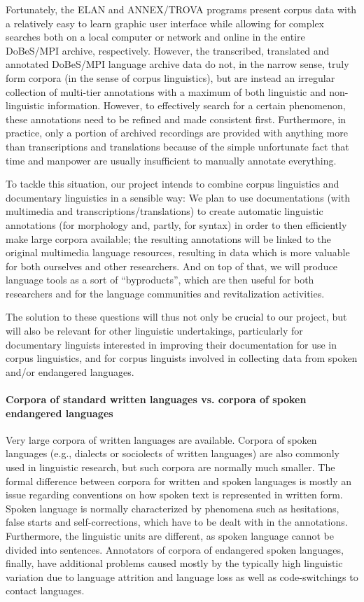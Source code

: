 \documentclass[a4paper,12pt]{article}
\begin{document}
Fortunately, the ELAN and ANNEX/TROVA programs present corpus data with a relatively easy to learn graphic user interface while allowing for complex searches both on a local computer or network and online in the entire DoBeS/MPI archive, respectively. However, the transcribed, translated and annotated DoBeS/MPI language archive data do not, in the narrow sense, truly form corpora (in the sense of corpus linguistics), but are instead an irregular collection of multi-tier annotations with a maximum of both linguistic and non-linguistic information. However, to effectively search for a certain phenomenon, these annotations need to be refined and made consistent first. Furthermore, in practice, only a portion of archived recordings are provided with anything more than transcriptions and translations because of the simple unfortunate fact that time and manpower are usually insufficient to manually annotate everything.

To tackle this situation, our project intends to combine corpus linguistics and documentary linguistics in a sensible way: We plan to use documentations (with multimedia and transcriptions/translations) to create automatic linguistic annotations (for morphology and, partly, for syntax) in order to then efficiently make large corpora available; the resulting annotations will be linked to the original multimedia language resources, resulting in data which is more valuable for both ourselves and other researchers. And on top of that, we will produce language tools as a sort of “byproducts”, which are then useful for both researchers and for the language communities and revitalization activities.

The solution to these questions will thus not only be crucial to our project, but will also be relevant for other linguistic undertakings, particularly for documentary linguists interested in improving their documentation for use in corpus linguistics, and for corpus linguists involved in collecting data from spoken and/or endangered languages.

\paragraph{Corpora of standard written languages vs. corpora of spoken endangered languages} 
Very large corpora of written languages are available. Corpora of spoken languages (e.g., dialects or sociolects of written languages) are also commonly used in linguistic research, but such corpora are normally much smaller. The formal difference between corpora for written and spoken languages is mostly an issue regarding conventions on how spoken text is represented in written form. Spoken language is normally characterized by phenomena such as hesitations, false starts and self-corrections, which have to be dealt with in the annotations. Furthermore, the linguistic units are different, as spoken language cannot be divided into sentences. Annotators of corpora of endangered spoken languages, finally, have additional problems caused mostly by the typically high linguistic variation due to language attrition and language loss as well as code-switchings to contact languages.
\end{document}
